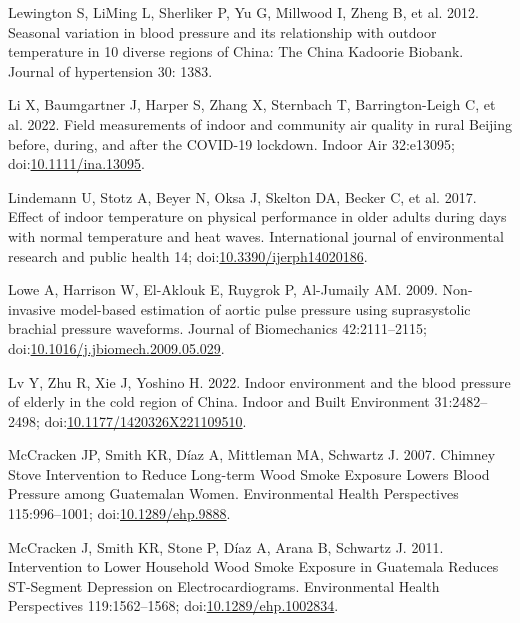 \documentclass[
  letterpaper,
  DIV=11,
  numbers=noendperiod]{scrartcl}
\newlength{\cslhangindent}
\newenvironment{CSLReferences}[2] %
 {\begin{list}{}{%
  \setlength{\itemindent}{0pt}
  \setlength{\leftmargin}{0pt}
  \setlength{\parsep}{0pt}
  \ifodd #1
   \setlength{\leftmargin}{\cslhangindent}
   \setlength{\itemindent}{-1\cslhangindent}
  \fi
  \setlength{\itemsep}{#2\baselineskip}}}
 {\end{list}}
\begin{document}
\begin{CSLReferences}{1}{1}
Lewington S, LiMing L, Sherliker P, Yu G, Millwood I, Zheng B, et al.
2012. Seasonal variation in blood pressure and its relationship with
outdoor temperature in 10 diverse regions of {China}: The {China
Kadoorie Biobank}. Journal of hypertension 30: 1383.

Li X, Baumgartner J, Harper S, Zhang X, Sternbach T, Barrington-Leigh C,
et al. 2022. Field measurements of indoor and community air quality in
rural {Beijing} before, during, and after the {COVID-19} lockdown.
Indoor Air 32:e13095;
doi:\href{https://doi.org/10.1111/ina.13095}{10.1111/ina.13095}.

Lindemann U, Stotz A, Beyer N, Oksa J, Skelton DA, Becker C, et al.
2017. Effect of indoor temperature on physical performance in older
adults during days with normal temperature and heat waves. International
journal of environmental research and public health 14;
doi:\href{https://doi.org/10.3390/ijerph14020186}{10.3390/ijerph14020186}.

Lowe A, Harrison W, El-Aklouk E, Ruygrok P, Al-Jumaily AM. 2009.
Non-invasive model-based estimation of aortic pulse pressure using
suprasystolic brachial pressure waveforms. Journal of Biomechanics
42:2111--2115;
doi:\href{https://doi.org/10.1016/j.jbiomech.2009.05.029}{10.1016/j.jbiomech.2009.05.029}.

Lv Y, Zhu R, Xie J, Yoshino H. 2022. Indoor environment and the blood
pressure of elderly in the cold region of {China}. Indoor and Built
Environment 31:2482--2498;
doi:\href{https://doi.org/10.1177/1420326X221109510}{10.1177/1420326X221109510}.

McCracken JP, Smith KR, Díaz A, Mittleman MA, Schwartz J. 2007. Chimney
{Stove Intervention} to {Reduce Long-term Wood Smoke Exposure Lowers
Blood Pressure} among {Guatemalan Women}. Environmental Health
Perspectives 115:996--1001;
doi:\href{https://doi.org/10.1289/ehp.9888}{10.1289/ehp.9888}.

McCracken J, Smith KR, Stone P, Díaz A, Arana B, Schwartz J. 2011.
Intervention to {Lower Household Wood Smoke Exposure} in {Guatemala
Reduces ST-Segment Depression} on {Electrocardiograms}. Environmental
Health Perspectives 119:1562--1568;
doi:\href{https://doi.org/10.1289/ehp.1002834}{10.1289/ehp.1002834}.


\end{CSLReferences}
\end{document}
